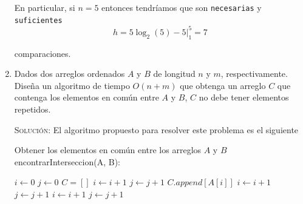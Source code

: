 \documentclass[letterpaper,11pt]{article}
\begin{document}
\begin{enumerate}
    En particular, si $n = 5$ entonces tendríamos que son \texttt{necesarias} y 
    \texttt{suficientes}
    \begin{equation*}
        h = 5 \log_2 (5) - 5 \Big|_1^5 = 7
    \end{equation*} 
    
    comparaciones.

    \newpage
    \item Dados dos arreglos ordenados $A$ y $B$ de longitud $n$ y $m$, 
    respectivamente. Diseña un algoritmo de tiempo $O(n + m)$ que obtenga un 
    arreglo $C$ que contenga los elementos en común entre $A$ y $B$, $C$ no 
    debe tener elementos repetidos.

    \textsc{Solución:} El algoritmo propuesto para resolver este problema es 
    el siguiente
    \begin{center}
    \begin{minipage}[c]{0.7\textwidth}
    \begin{algorithm}[H]
        \caption{Obtener los elementos en común entre los arreglos $A$ y $B$ \\
                 encontrarInterseccion(A, B): } 
        \begin{algorithmic}[1]
            \State $i \gets 0$
            \State $j \gets 0$
            \State $C = []$
                        \State $i \gets i + 1$
                        \State $j \gets j + 1$
                    \Else
                        \State $C.append[A[i]]$
                        \State $i \gets i + 1$
                        \State $j \gets j + 1$
                    \EndIf
                \Else {}
                    \State $i \gets i + 1$
                \Else
                    \State $j \gets j + 1$
                \EndIf
                \EndIf
            \EndWhile
        \end{algorithmic} 
    \end{algorithm}
    \end{minipage}
    \end{center}
   

\end{enumerate}
\end{document}
